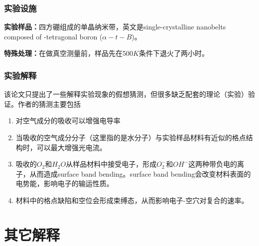 \documentclass[english]{ctexart}
\begin{document}
\section{实验设施}

\textbf{实验样品：}四方硼组成的单晶纳米带，英文是single-crystalline nanobelts composed
of -tetragonal boron ($\alpha-t-B$)。

\textbf{特殊处理：}在做真空测量前，样品先在500$K$条件下退火了两小时。

\section{实验解释}

该论文只提出了一些解释实验现象的假想猜测，但很多缺乏配套的理论（实验）验证。作者的猜测主要包括
\begin{enumerate}
\item 对空气成分的吸收可以增强电导率
\item 当吸收的空气成分分子（这里指的是水分子）与实验样品材料有近似的格点结构时，可以最大增强光电流。
\item 吸收的$O_{2}$和$H_{2}O$从样品材料中接受电子，形成$O_{2}^{-}$和$OH^{-}$这两种带负电的离子，从而造成surface
band bending。surface band bending会改变材料表面的电势能，影响电子的输运性质。
\item 材料中的格点缺陷和空位会形成束缚态，从而影响电子-空穴对复合的速率。
\end{enumerate}

\part{其它解释}
\end{document}

